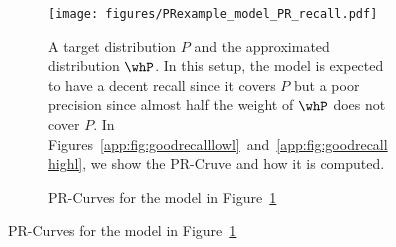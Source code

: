 \documentclass[twoside]{article}
\begin{document}
\begin{figure}[H]
\begin{minipage}[c]{0.3\textwidth}
    \begin{figure}[H]
        \centering
\texttt{[image: figures/PRexample\_model\_PR\_recall.pdf]}
        \caption{A target distribution $P$ and the approximated distribution $\whP$. In this setup, the model is expected to have a decent recall since it covers $P$ but a poor precision since almost half the weight of $\whP$ does not cover $P$.  In Figures~\ref{app:fig:goodrecalllowl}~and~\ref{app:fig:goodrecallhighl}, we show the PR-Cruve and how it is computed.}
        \label{app:fig:goodrecall}
    \end{figure}
\end{minipage}
\hfill
\begin{minipage}[c]{0.65\textwidth}
    \begin{figure}[H]
        
        \caption{PR-Curves for the model in Figure~\ref{app:fig:goodrecall}}
    \end{figure}
\end{minipage}
\end{figure}
\end{document}
